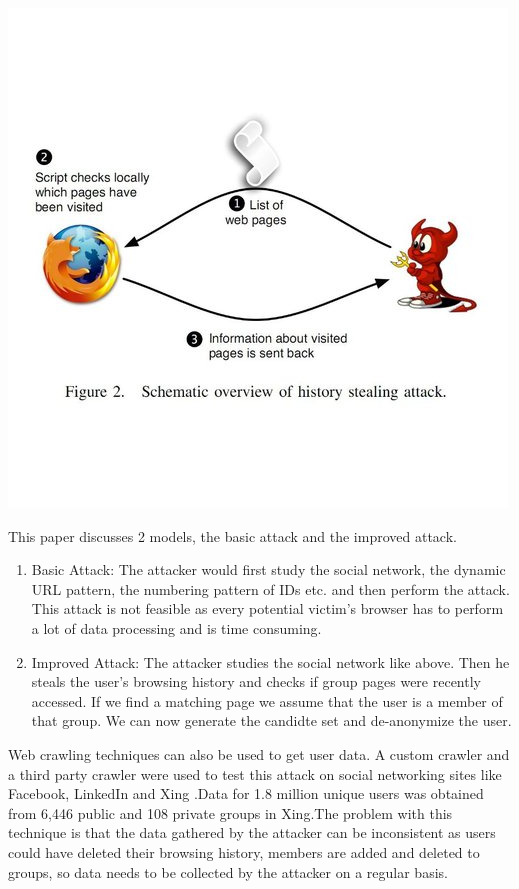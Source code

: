 \documentclass{article}
\begin{document}
\includegraphics[scale=0.7]{HistoryStealing}

 This paper discusses 2 models, the basic attack and the improved attack.

\begin{enumerate}
\item Basic Attack: The attacker would first study the social network, the dynamic URL pattern, the numbering pattern of IDs etc. and then perform the attack. This attack is not feasible as every potential victim’s browser has to perform a lot of data processing and is time consuming.
\item  Improved Attack: The attacker studies the social network like above. Then he steals the user’s browsing history and checks if group pages were recently accessed. If we find a matching page we assume that the user is a member of that group. We can now generate the candidte set and de-anonymize the user.

\end{enumerate}

Web crawling techniques can also be used to get user data. A custom crawler and a third party crawler were used to test this attack on social networking sites like Facebook, LinkedIn and Xing .Data for 1.8 million unique users was obtained from 6,446 public and 108 private groups in Xing.The problem with this technique is that the data gathered by the attacker can be inconsistent as users could have deleted their browsing history, members are added and deleted to groups, so data needs to be collected by the attacker on a regular basis.\\
\end{document}
